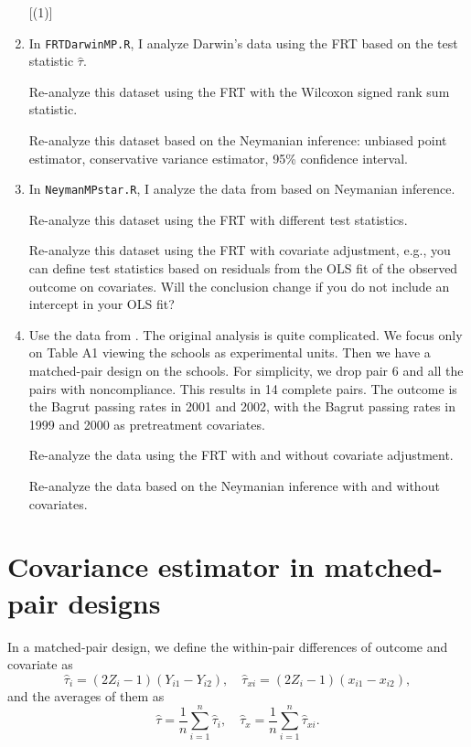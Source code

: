 \documentclass[11pt]{article}
\theoremstyle{definition}
\begin{document}
\begin{enumerate}
[(1)]
\item
In \texttt{FRTDarwinMP.R}, I analyze Darwin's data using the FRT based on the test statistic $\hat{\tau}$.

Re-analyze this dataset using the FRT with the Wilcoxon signed rank sum statistic.

Re-analyze this dataset based on the Neymanian inference: unbiased point estimator, conservative variance estimator, 95\% confidence interval.


\item
In \texttt{NeymanMPstar.R}, I analyze the data from based on Neymanian inference.

Re-analyze this dataset using the FRT with different test statistics. 

Re-analyze this dataset using the FRT with covariate adjustment, e.g., you can define test statistics based on residuals from the OLS fit of the observed outcome on covariates. Will the conclusion change if you do not include an intercept in your OLS fit?

\item 
Use the data from \citet{angrist_highschool}. The original analysis is quite complicated. We focus only on Table A1 viewing the schools as experimental units. Then we have a matched-pair design on the schools. For simplicity, we drop pair 6 and all the pairs with noncompliance. This results in 14 complete pairs. The outcome is the Bagrut passing rates in 2001 and 2002, with the Bagrut passing rates in 1999 and 2000 as pretreatment covariates. 

Re-analyze the data using the FRT with and without covariate adjustment.

Re-analyze the data based on the Neymanian inference with and without covariates. 
 

\end{enumerate}




\section{Covariance estimator in matched-pair designs}
In a matched-pair design, we define the within-pair differences of outcome and covariate as
$$
\hat{\tau}_i= (2Z_i-1) (Y_{i1} - Y_{i2}),\quad
\hat{\tau}_{xi} = (2Z_i-1) (x_{i1} - x_{i2}),
$$
and the averages of them as
$$
\hat{\tau} = \frac{1}{n} \sum_{i=1}^n \hat{\tau}_i,\quad
\hat{\tau}_{x}  = \frac{1}{n} \sum_{i=1}^n \hat{\tau}_{xi}.
$$
\end{document}
